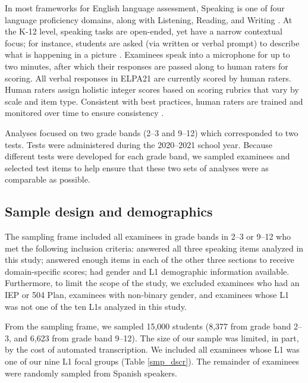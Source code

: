 \documentclass [PhD] {uclathes}
\begin{document}
In most frameworks for English language assessment, Speaking is one of four language proficiency domains, along with Listening, Reading, and Writing \citep{ccsso2012framework}. At the K-12 level, speaking tasks are open-ended, yet have a narrow contextual focus; for instance, students are asked (via written or verbal prompt) to describe what is happening in a picture \citep{luoma2004assessing}. Examinees speak into a microphone for up to two minutes, after which their responses are passed along to human raters for scoring. All verbal responses in ELPA21 are currently scored by human raters. Human raters assign holistic integer scores based on scoring rubrics that vary by scale and item type. Consistent with best practices, human raters are trained and monitored over time to ensure consistency \citep{engelhard2002monitoring}. 

Analyses focused on two grade bands (2–3 and 9–12) which corresponded to two tests. Tests were administered during the 2020–2021 school year. Because different tests were developed for each grade band, we sampled examinees and selected test items to help ensure that these two sets of analyses were as comparable as possible. 

\subsection{Sample design and demographics}
\label{sec:meth_sample}

The sampling frame included all examinees in grade bands in 2–3 or 9–12 who met the following inclusion criteria: answered all three speaking items analyzed in this study; answered enough items in each of the other three sections to receive domain-specific scores; had gender and L1 demographic information available. Furthermore, to limit the scope of the study, we excluded examinees who had an IEP or 504 Plan, examinees with non-binary gender, and examinees whose L1 was not one of the ten L1s analyzed in this study. 

From the sampling frame, we sampled 15,000 students (8,377 from grade band 2–3, and 6,623 from grade band 9–12). The size of our sample was limited, in part, by the cost of automated transcription. We included all examinees whose L1 was one of our nine L1 focal groups (Table \ref{smp_dscr}). The remainder of examinees were randomly sampled from Spanish speakers. 
\end{document}
